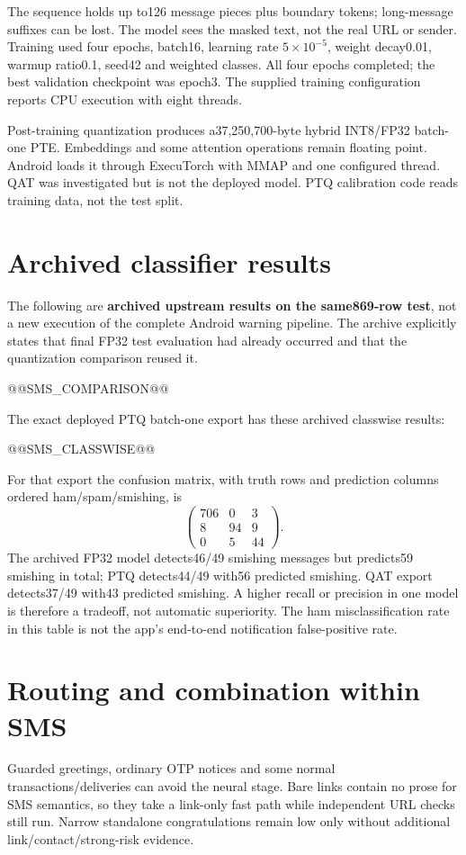 The sequence holds up to126 message pieces plus boundary tokens; long-message suffixes can be lost. The model sees the masked text, not the real URL or sender. Training used four epochs, batch16, learning rate \(5\times10^{-5}\), weight decay0.01, warmup ratio0.1, seed42 and weighted classes. All four epochs completed; the best validation checkpoint was epoch3. The supplied training configuration reports CPU execution with eight threads.

Post-training quantization produces a37,250,700-byte hybrid INT8/FP32 batch-one PTE. Embeddings and some attention operations remain floating point. Android loads it through ExecuTorch with MMAP and one configured thread. QAT was investigated but is not the deployed model. PTQ calibration code reads training data, not the test split.

\section{Archived classifier results}
The following are \textbf{archived upstream results on the same869-row test}, not a new execution of the complete Android warning pipeline. The archive explicitly states that final FP32 test evaluation had already occurred and that the quantization comparison reused it.

@@SMS_COMPARISON@@

The exact deployed PTQ batch-one export has these archived classwise results:

@@SMS_CLASSWISE@@

For that export the confusion matrix, with truth rows and prediction columns ordered ham/spam/smishing, is
\[
\begin{pmatrix}706&0&3\\8&94&9\\0&5&44\end{pmatrix}.
\]
The archived FP32 model detects46/49 smishing messages but predicts59 smishing in total; PTQ detects44/49 with56 predicted smishing. QAT export detects37/49 with43 predicted smishing. A higher recall or precision in one model is therefore a tradeoff, not automatic superiority. The ham misclassification rate in this table is not the app's end-to-end notification false-positive rate.

\section{Routing and combination within SMS}
Guarded greetings, ordinary OTP notices and some normal transactions/deliveries can avoid the neural stage. Bare links contain no prose for SMS semantics, so they take a link-only fast path while independent URL checks still run. Narrow standalone congratulations remain low only without additional link/contact/strong-risk evidence.


